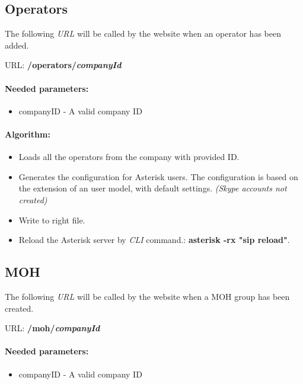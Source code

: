 \subsection{Operators}
The following \textit{URL} will be called by the website when an operator has been added.
\newline

URL: \textbf{/operators/{\textit{companyId}}}

\paragraph{Needed parameters:}
\begin{itemize}
\item {companyID} - A valid company ID
\end{itemize}


\paragraph{Algorithm:}
\begin{itemize}
	\item Loads all the operators from the company with provided ID.
	\item Generates the configuration for Asterisk users. The configuration is based on the extension of an user model, with default settings. \textit{(Skype accounts not created)}
	\item Write to right file.
	\item Reload the Asterisk server by \textit{CLI} command.: \textbf{asterisk -rx "sip reload"}.

\end{itemize}



\subsection{MOH}
The following \textit{URL} will be called by the website when a MOH group has been created.
\newline

URL: \textbf{/moh/{\textit{companyId}}}

\paragraph{Needed parameters:}
\begin{itemize}
\item {companyID} - A valid company ID
\end{itemize}


